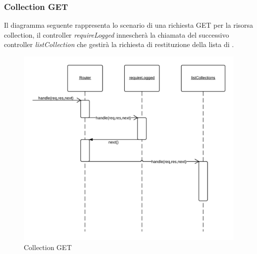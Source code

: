 \subsubsection{Collection GET} 
Il diagramma seguente rappresenta lo scenario di una richiesta GET per la risorsa collection, il controller \emph{requireLogged} innescherà la chiamata del successivo controller \emph{listCollection} che gestirà la richiesta di restituzione della lista di .
\begin{figure}[H]
	\begin{center} 
		\includegraphics[scale=0.20]{scenari/Collection GET.png} 
		\caption{Collection GET}
	\end{center} 
\end{figure}

